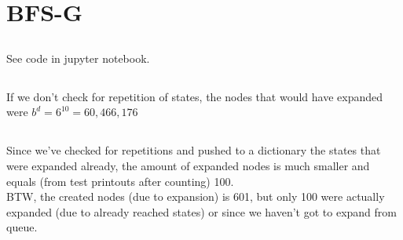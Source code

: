 \documentclass[12pt]{article}
\begin{document}
\section{BFS-G}

\subsection{}
See code in jupyter notebook.

\subsection{}
If we don't check for repetition of states, the nodes that would have expanded were $b^d=6^10=60,466,176$

\subsection{}
Since we've checked for repetitions and pushed to a dictionary the states that were expanded already, the amount of expanded nodes is much smaller and equals (from test printouts after counting) 100.\\
BTW, the created nodes (due to expansion) is 601, but only 100 were actually expanded (due to already reached states) or since we haven't got to expand from queue.\\
\end{document}
